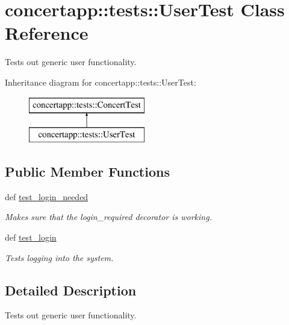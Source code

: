 \hypertarget{classconcertapp_1_1tests_1_1_user_test}{
\section{concertapp::tests::UserTest Class Reference}
\label{classconcertapp_1_1tests_1_1_user_test}
}


Tests out generic user functionality.  


Inheritance diagram for concertapp::tests::UserTest:\begin{figure}[H]
\begin{center}
\leavevmode
\includegraphics[height=2.000000cm]{classconcertapp_1_1tests_1_1_user_test}
\end{center}
\end{figure}
\subsection*{Public Member Functions}
\begin{DoxyCompactItemize}
\item 
def \hyperlink{classconcertapp_1_1tests_1_1_user_test_a9a2b5449963db7ad158b091ee7f37b2a}{test\_\-login\_\-needed}
\begin{DoxyCompactList}\small\item\em Makes sure that the login\_\-required decorator is working. \item\end{DoxyCompactList}\item 
def \hyperlink{classconcertapp_1_1tests_1_1_user_test_ad18c385614256effd936176c60fc1050}{test\_\-login}
\begin{DoxyCompactList}\small\item\em Tests logging into the system. \item\end{DoxyCompactList}\end{DoxyCompactItemize}


\subsection{Detailed Description}
Tests out generic user functionality. 

